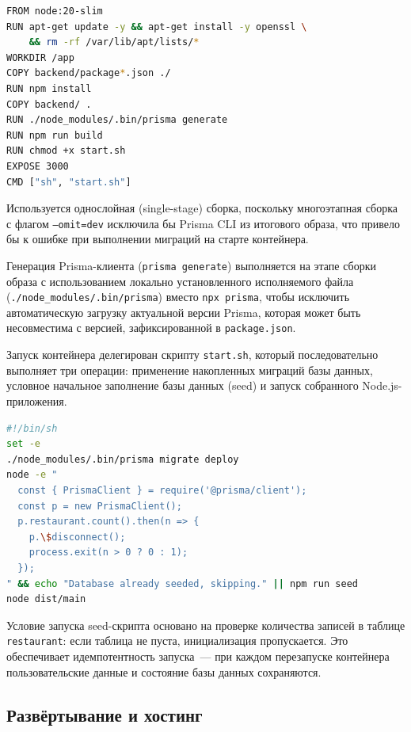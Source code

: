 \begin{lstlisting}[language=bash,
                   caption={Dockerfile серверной части},
                   label=lst:dockerfile]
FROM node:20-slim
RUN apt-get update -y && apt-get install -y openssl \
    && rm -rf /var/lib/apt/lists/*
WORKDIR /app
COPY backend/package*.json ./
RUN npm install
COPY backend/ .
RUN ./node_modules/.bin/prisma generate
RUN npm run build
RUN chmod +x start.sh
EXPOSE 3000
CMD ["sh", "start.sh"]
\end{lstlisting}

Используется однослойная (single-stage) сборка, поскольку
многоэтапная сборка с флагом \texttt{--omit=dev} исключила бы
Prisma CLI из итогового образа, что привело бы к ошибке при
выполнении миграций на старте контейнера.

Генерация Prisma-клиента (\texttt{prisma generate}) выполняется на
этапе сборки образа с использованием локально установленного
исполняемого файла (\texttt{./node\_modules/.bin/prisma}) вместо
\texttt{npx prisma}, чтобы исключить автоматическую загрузку
актуальной версии Prisma, которая может быть несовместима с версией,
зафиксированной в \texttt{package.json}.

Запуск контейнера делегирован скрипту \texttt{start.sh}, который
последовательно выполняет три операции: применение накопленных
миграций базы данных, условное начальное заполнение базы данных
(seed) и запуск собранного Node.js-приложения.

\begin{lstlisting}[language=bash,
                   caption={Скрипт запуска контейнера start.sh},
                   label=lst:startsh]
#!/bin/sh
set -e
./node_modules/.bin/prisma migrate deploy
node -e "
  const { PrismaClient } = require('@prisma/client');
  const p = new PrismaClient();
  p.restaurant.count().then(n => {
    p.\$disconnect();
    process.exit(n > 0 ? 0 : 1);
  });
" && echo "Database already seeded, skipping." || npm run seed
node dist/main
\end{lstlisting}

Условие запуска seed-скрипта основано на проверке количества записей
в таблице \texttt{restaurant}: если таблица не пуста, инициализация
пропускается. Это обеспечивает идемпотентность запуска~--- при каждом
перезапуске контейнера пользовательские данные и состояние базы
данных сохраняются.

\subsection{Развёртывание и хостинг}

